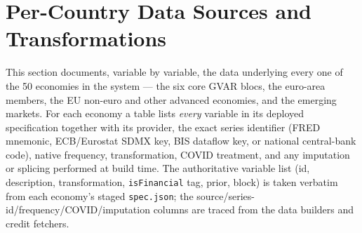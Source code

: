 
\section{Per-Country Data Sources and Transformations}\label{sec:percountry-data-all}

This section documents, variable by variable, the data underlying every one
of the 50 economies in the system --- the six core GVAR blocs, the euro-area
members, the EU non-euro and other advanced economies, and the emerging
markets. For each economy a table lists \emph{every} variable in its deployed
specification together with its provider, the exact series identifier (FRED
mnemonic, ECB/Eurostat SDMX key, BIS dataflow key, or national central-bank
code), native frequency, transformation, COVID treatment, and any imputation
or splicing performed at build time. The authoritative variable list (id,
description, transformation, \texttt{isFinancial} tag, prior, block) is taken
verbatim from each economy's staged \texttt{spec.json}; the
source/series-id/frequency/COVID/imputation columns are traced from the data
builders and credit fetchers.

